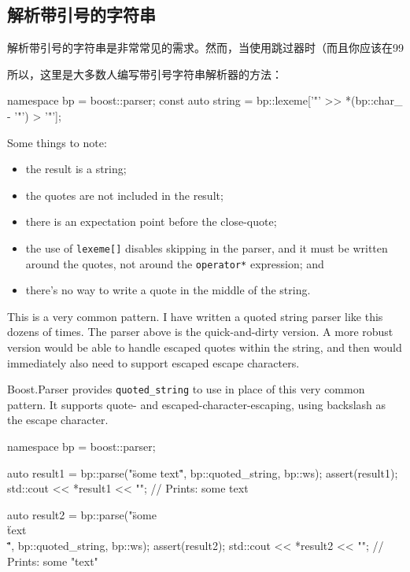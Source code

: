 \subsection{解析带引号的字符串}

解析带引号的字符串是非常常见的需求。然而，当使用跳过器时（而且你应该在99%

所以，这里是大多数人编写带引号字符串解析器的方法：

\begin{code}
namespace bp = boost::parser;
const auto string = bp::lexeme['"' >> *(bp::char_ - '"') > '"'];
\end{code}

Some things to note:

\begin{itemize}
\item
  the result is a string;
\item
  the quotes are not included in the result;
\item
  there is an expectation point before the close-quote;
\item
  the use of \texttt{lexeme{[}{]}} disables skipping in the parser, and it must be written around the quotes, not around the \texttt{operator*} expression; and
\item
  there's no way to write a quote in the middle of the string.
\end{itemize}

This is a very common pattern. I have written a quoted string parser like this dozens of times. The parser above is the quick-and-dirty version. A more robust version would be able to handle escaped quotes within the string, and then would immediately also need to support escaped escape characters.

Boost.Parser provides \texttt{quoted\_string} to use in place of this very common pattern. It supports quote- and escaped-character-escaping, using backslash as the escape character.

\begin{code}
namespace bp = boost::parser;

auto result1 = bp::parse("\"some text\"", bp::quoted_string, bp::ws);
assert(result1);
std::cout << *result1 << "\n"; // Prints: some text

auto result2 =
    bp::parse("\"some \\\"text\\\"\"", bp::quoted_string, bp::ws);
assert(result2);
std::cout << *result2 << "\n"; // Prints: some "text"
\end{code}

